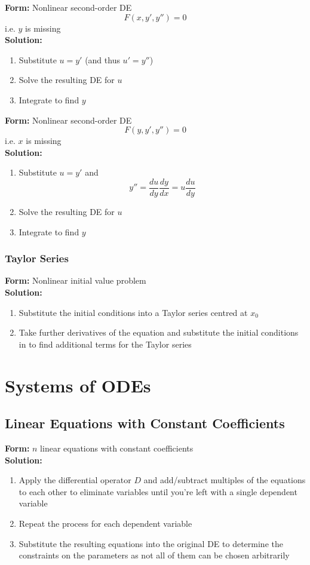 \documentclass{article}
\begin{document}
\textbf{Form:} Nonlinear second-order DE \[F(x, y', y'') = 0\] i.e. $y$ is missing \\ \textbf{Solution:} \begin{enumerate}
  \item Substitute $u = y'$ (and thus $u' = y''$)

  \item Solve the resulting DE for $u$

  \item Integrate to find $y$
\end{enumerate} \textbf{Form:} Nonlinear second-order DE \[F(y, y', y'') = 0\] i.e. $x$ is missing \\ \textbf{Solution:} \begin{enumerate}
  \item Substitute $u = y'$ and \[y'' = \frac{du}{dy} \frac{dy}{dx} = u \frac{du}{dy}\]

  \item Solve the resulting DE for $u$

  \item Integrate to find $y$
\end{enumerate}

\subsubsection{Taylor Series}

\textbf{Form:} Nonlinear initial value problem \\ \textbf{Solution:} \begin{enumerate}
  \item Substitute the initial conditions into a Taylor series centred at $x_0$

  \item Take further derivatives of the equation and substitute the initial conditions in to find additional terms for the Taylor series
\end{enumerate}

\section{Systems of ODEs}

\subsection{Linear Equations with Constant Coefficients}

\textbf{Form:} $n$ linear equations with constant coefficients \\ \textbf{Solution:} \begin{enumerate}
  \item Apply the differential operator $D$ and add/subtract multiples of the equations to each other to eliminate variables until you're left with a single dependent variable

  \item Repeat the process for each dependent variable

  \item Substitute the resulting equations into the original DE to determine the constraints on the parameters as not all of them can be chosen arbitrarily
\end{enumerate}
\end{document}
